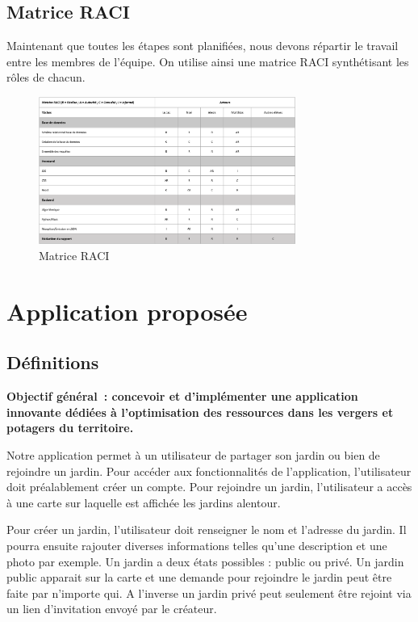\documentclass[french,a4paper]{article}
\begin{document}
\subsection{Matrice RACI}
Maintenant que toutes les étapes sont planifiées, nous devons répartir le travail entre les membres de l’équipe. On utilise ainsi une matrice RACI synthétisant les rôles de chacun.

\begin{figure}[H]
    \centering
    \includegraphics[width=0.75\textwidth]{img/RACI.png}
    \caption{Matrice RACI}
\end{figure} 

\newpage
\section{Application proposée}
\subsection{Définitions}
\textbf{Objectif général~: concevoir et d’implémenter une application innovante dédiées à l’optimisation des ressources dans les vergers et potagers du territoire.}

Notre application permet à un utilisateur de partager son jardin ou bien de rejoindre un jardin. Pour accéder aux fonctionnalités de l'application, l'utilisateur doit préalablement créer un compte.
Pour rejoindre un jardin, l'utilisateur a accès à une carte sur laquelle est affichée les jardins alentour.

Pour créer un jardin, l'utilisateur doit renseigner le nom et l'adresse du jardin. Il pourra ensuite rajouter diverses informations telles qu'une description et une photo par exemple. Un jardin a deux états possibles : public ou privé. Un jardin public apparait sur la carte et une demande pour rejoindre le jardin peut être faite par n'importe qui. A l'inverse un jardin privé peut seulement être rejoint via un lien d'invitation envoyé par le créateur.
\end{document}
